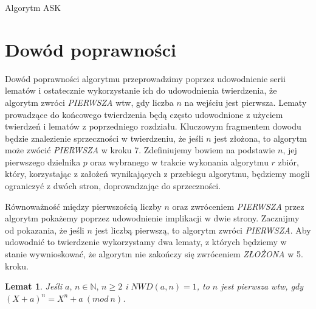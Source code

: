 \documentclass[declaration,shortabstract]{iithesis}
\theoremstyle{definition}
\theoremstyle{remark} \newtheorem{observation}{Obserwacja}
\theoremstyle{plain} \newtheorem{theorem}{Twierdzenie}
\theoremstyle{plain} \newtheorem{lemma}{Lemat}
\theoremstyle{remark} \newtheorem*{remark*}{Uwaga}
\theoremstyle{reminder} \newtheorem*{reminder*}{Przypomnienie}
\begin{document}
\begin{algorithm}
	\caption{Algorytm ASK}
	\begin{algorithmic}[1]
									    
		 
		\EndIf
		 
		 
		\EndIf
		   \EndIf
		 
		 
		\EndIf
		\EndFor
		 
	\end{algorithmic}
\end{algorithm}
	
\section{Dowód poprawności}
    
Dowód poprawności algorytmu przeprowadzimy poprzez udowodnienie serii lematów i ostatecznie wykorzystanie ich do udowodnienia twierdzenia, że algorytm zwróci \textit{PIERWSZA} wtw, gdy liczba $n$ na wejściu jest pierwsza. Lematy prowadzące do końcowego twierdzenia będą często udowodnione z użyciem twierdzeń i lematów z poprzedniego rozdziału. Kluczowym fragmentem dowodu będzie znalezienie sprzeczności w twierdzeniu, że jeśli $n$ jest złożona, to algorytm może zwócić \textit{PIERWSZA} w kroku 7. Zdefiniujemy bowiem na podstawie $n$, jej pierwszego dzielnika $p$ oraz wybranego w trakcie wykonania algorytmu $r$ zbiór, który, korzystając z założeń wynikających z przebiegu algorytmu, będziemy mogli ograniczyć z dwóch stron, doprowadzając do sprzeczności. 

Równoważność między pierwszością liczby $n$ oraz zwróceniem \textit{PIERWSZA} przez algorytm pokażemy poprzez udowodnienie implikacji w dwie strony. Zacznijmy od pokazania, że jeśli $n$ jest liczbą pierwszą, to algorytm zwróci \textit{PIERWSZA}. Aby udowodnić to twierdzenie wykorzystamy dwa lematy, z których będziemy w stanie wywnioskować, że algorytm nie zakończy się zwróceniem \textit{ZŁOŻONA} w 5. kroku.
\begin{lemma}\label{L1}
	Jeśli $a, \, n \in \mathbb{N}, \, n \geq 2$ i $NWD(a, n) = 1$, to $n$ jest pierwsza wtw, gdy $(X + a)^n = X^n + a \: (mod \: n)$.
\end{lemma}
	
\end{document}
